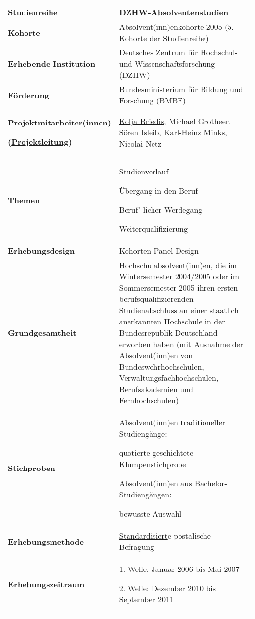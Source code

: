 \begin{longtable}{P{12em}Q}\toprule
  \textbf{Studienreihe}
     & DZHW-Absolventenstudien\\\midrule
  \textbf{Kohorte}
     & Absol\-vent(inn)en\-kohorte 2005 (5. Kohorte der Studienreihe)\\\midrule
  \textbf{Erhebende Institution}
     & Deutsches Zentrum für Hochschul- und Wissenschaftsforschung (DZHW)\\\midrule
  \textbf{Förderung}
     & Bundesministerium für Bildung und Forschung (BMBF)\\\midrule
  \textbf{Projektmitarbeiter(innen)}\par \textbf{(\underline{Projektleitung})}
     & \underline{Kolja Briedis}, Michael Grotheer, Sören Isleib, \underline{Karl-Heinz Minks}, Nicolai Netz\\\midrule
  \textbf{Themen}
     & Studienverlauf\par Übergang in den Beruf\par Beruf"|licher Werdegang\par Weiterqualifizierung\\\midrule
  \textbf{Erhebungsdesign}
     & Kohorten-Panel-Design\\\midrule
  \textbf{Grundgesamtheit}
     & Hochschulabsolvent(inn)en, die im Wintersemester 2004\slash2005 oder im Sommersemester 2005 ihren ersten berufsqualifizierenden Studienabschluss an einer staatlich anerkannten Hochschule in der Bundesrepublik Deutschland erworben haben (mit Ausnahme der Absolvent(inn)en von Bundeswehrhochschulen, Verwaltungsfachhochschulen, Berufsakademien und Fernhochschulen)\\\midrule
  \textbf{Stichproben}           & Absolvent(inn)en traditioneller Studiengänge:\par quotierte geschichtete Klumpenstichprobe\par Absolvent(inn)en aus Bachelor-Studiengängen:\par bewusste Auswahl\\\midrule
  \textbf{Erhebungsmethode}
     & \href{https://www.google.de/search?q=Standardisiert & spell=1 & sa=X & ved=0ahUKEwiTk9W1jNLLAhUhA3MKHXpnAQUQvwUIGigA}{Standardisiert}e postalische Befragung\\\midrule
  \textbf{Erhebungszeitraum}
     & 1. Welle: Januar 2006 bis Mai 2007\par 2. Welle: Dezember 2010 bis September 2011\\\midrule

\end{longtable}
